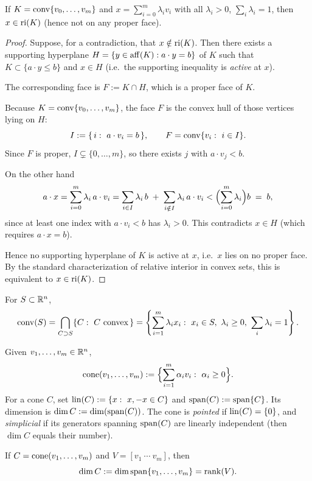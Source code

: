 \begin{lemma}\label{lem:ri-barycentric}
If $K=\operatorname{conv}\{v_0,\dots,v_m\}$ and $x=\displaystyle \sum_{i=0}^m \lambda_i v_i$ with all
$\lambda_i>0$, $\displaystyle\sum_i\lambda_i=1$, then $x\in\operatorname{ri}(K)$ (hence not on any proper face).
\end{lemma}
\begin{proof}
Suppose, for a contradiction, that $x\notin\operatorname{ri}(K)$. Then there exists a supporting
hyperplane $H=\{y\in\operatorname{aff}(K): a\cdot y=b\}$ of $K$ such that $K\subset\{a\cdot y\le b\}$
and $x\in H$ (i.e.\ the supporting inequality is \emph{active} at $x$).

The corresponding face is $F:=K\cap H$, which is a proper face of $K$.

Because $K=\operatorname{conv}\{v_0,\dots,v_m\}$, the face $F$ is the convex hull of those
vertices lying on $H$:
\[
I:=\{\,i:\ a\cdot v_i=b\,\},\qquad F=\operatorname{conv}\{v_i:\ i\in I\}.
\]
Since $F$ is proper, $I\subsetneq\{0,\dots,m\}$,
so there exists $j$ with $a\cdot v_j<b$.

On the other hand
\[
a\cdot x=\sum_{i=0}^m \lambda_i\, a\cdot v_i
=\sum_{i\in I}\lambda_i\, b \;+\; \sum_{i\notin I}\lambda_i\, a\cdot v_i
< \Bigl(\sum_{i=0}^m \lambda_i\Bigr)b \;=\; b,
\]
since at least one index with $a\cdot v_i<b$ has $\lambda_i>0$.
This contradicts $x\in H$ (which requires $a\cdot x=b$).

Hence no supporting hyperplane of $K$ is active at $x$, i.e.\ $x$ lies on no
proper face. By the standard characterization of relative interior in convex
sets, this is equivalent to $x\in\operatorname{ri}(K)$.
\end{proof}

\begin{definition}\label{def:conv-hull}
For $S\subset\mathbb{R}^n$,
\[
\conv(S)=\bigcap_{C \supset S}\{C:\ C\text{ convex}\,\}
=\left\{\sum_{i=1}^m \lambda_i x_i:\ x_i\in S,\ \lambda_i\ge 0,\ \sum_i\lambda_i=1\right\}.
\]
\end{definition}

\begin{definition}\label{def:cone}
Given $v_1,\dots,v_m\in\mathbb{R}^n$,
\[
\operatorname{cone}(v_1,\dots,v_m):=\Bigl\{\sum_{i=1}^m \alpha_i v_i:\ \alpha_i\ge 0\Bigr\}.
\]
For a cone $C$, set $\operatorname{lin}(C):=\{x:\ x,-x\in C\}$ and $\operatorname{span}(C):=\operatorname{span}\{C\}$.
Its dimension is $\dim C:=\dim(\operatorname{span}(C))$. The cone is \emph{pointed} if
$\operatorname{lin}(C)=\{0\}$, and \emph{simplicial} if its generators spanning $\operatorname{span}(C)$
are linearly independent (then $\dim C$ equals their number).
\end{definition}

\begin{definition}\label{def:cone-dim}
If $C=\operatorname{cone}(v_1,\dots,v_m)$ and $V=[v_1\ \cdots\ v_m]$, then
\[
\dim C:=\dim\operatorname{span}\{v_1,\dots,v_m\}=\operatorname{rank}(V).
\]
\end{definition}
